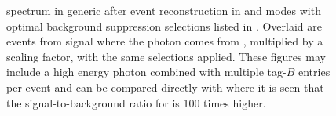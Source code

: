 \begin{figure}[htbp!]
    \centering
    \caption{\label{fig:spectrum_after_optimisation}
    \BtoXsgamma spectrum in generic \MC after event reconstruction in \feiBp and \feiBz modes with optimal background suppression selections listed in .
    Overlaid are events from signal \MC where the photon comes from \BtoXsgamma, multiplied by a scaling factor, with the same selections applied.
    These figures may include a high energy photon combined with multiple tag-$B$ entries per event and can be compared directly with  where it is seen that
    the signal-to-background ratio for \BtoXsgamma is 100 times higher.}
\end{figure}

